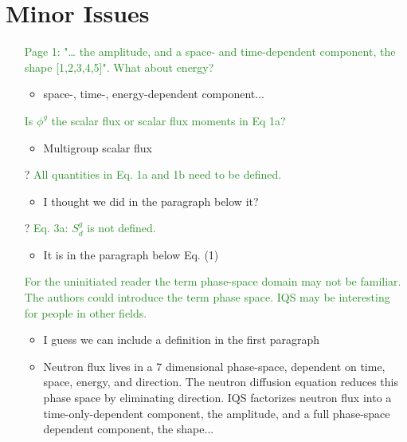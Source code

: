 \documentclass{elsarticle}
\newcommand{\fix}{\textsquare}
\newcommand{\nofix}{?}
\newcommand{\easy}[1]{\textcolor{ForestGreen}{#1}}
\begin{document}
\section*{Minor Issues}

\begin{itemize}

\item[\fix] \easy{ Page 1: "… the amplitude, and a space- and time-dependent component, the shape [1,2,3,4,5]". What about energy? }
\begin{itemize}
\item space-, time-, energy-dependent component...
\end{itemize}

\item[\fix] \easy{ Is $\phi^g$ the scalar flux or scalar flux moments in Eq 1a? }
\begin{itemize}
\item Multigroup scalar flux
\end{itemize}

\item[\nofix] \easy{ All quantities in Eq. 1a and 1b need to be defined. }
\begin{itemize}
\item I thought we did in the paragraph below it?
\end{itemize}

\item[\nofix] \easy{ Eq. 3a: $S_d^g$ is not defined. }
\begin{itemize}
\item It is in the paragraph below Eq. (1)
\end{itemize}

\item[\fix] \easy{ For the uninitiated reader the term phase-space domain may not be familiar. The authors could introduce the term phase space. IQS may be interesting for people in other fields. }
\begin{itemize}
\item I guess we can include a definition in the first paragraph
\item Neutron flux lives in a 7 dimensional phase-space, dependent on time, space, energy, and direction. The neutron diffusion equation reduces this phase space by eliminating direction. IQS factorizes neutron flux into a time-only-dependent component, the amplitude, and a full phase-space dependent component, the shape...  
\end{itemize}


\end{itemize}
\end{document}
